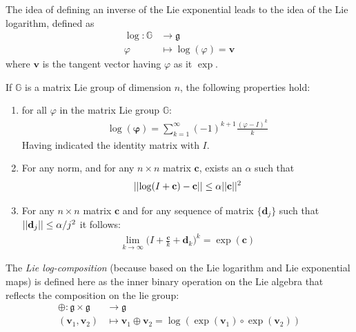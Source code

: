 The idea of defining an inverse of the Lie exponential leads to the idea of the Lie logarithm, defined as
\begin{align*}
\log : \mathbb{G} & \longrightarrow \mathfrak{g} \\
\varphi &\longmapsto \log (\varphi)  =  \mathbf{v}   
\end{align*}
where $\mathbf{v}$ is the tangent vector having $\varphi$ as it $\exp$.

\noindent
If $\mathbb{G}$ is a matrix Lie group of dimension $n$, the following properties hold:
\begin{enumerate}
	\item for all $\varphi$ in the matrix Lie group $\mathbb{G}$:
	\begin{align}\label{eq:log_as_inf_sum}
	\log(\mathbf{\varphi}) = \sum_{k=1}^{\infty}(-1)^{k+1} \frac{(\varphi-I)^{k} }{k}
	\end{align}
	Having indicated the identity matrix with $I$.
	\item For any norm, and for any $n\times n$ matrix $\mathbf{c}$, exists an $\alpha$ such that 
	\begin{align}\label{eq:prop_matrix_diff_log}
	\vert\lvert  \log(I + \mathbf{c}) - \mathbf{c}  \rvert\vert  \leq \alpha \vert\lvert  \mathbf{c} \rvert\vert^{2}
	\end{align}
	\item For any $n\times n$ matrix $\mathbf{c}$ and for any sequence of matrix $\{\mathbf{d}_{j}\}$ such that  $\vert\lvert  \mathbf{d}_{j} \rvert\vert \leq \alpha/j^2$ it follows:
	\begin{align}\label{eq:prop_matrix_lim}
	\lim_{k\rightarrow \infty} \big( I + \frac{\mathbf{c}}{k} + \mathbf{d}_{k} \big)^{k} = \exp{(\mathbf{c})}
	\end{align}
\end{enumerate} 

The \emph{Lie log-composition} (because based on the Lie logarithm and Lie exponential maps) is defined here as the inner binary operation on the Lie algebra that reflects the composition on the lie group:
\begin{align}\label{eq:main_def_log_composition}
\oplus : \mathfrak{g} \times \mathfrak{g} & \longrightarrow \mathfrak{g}    \\
(\mathbf{v}_{1}, \mathbf{v}_{2}) &\longmapsto \mathbf{v}_{1}\oplus \mathbf{v}_{2} =  \log(\exp(\mathbf{v}_1)\circ \exp(\mathbf{v}_2))
\end{align}

